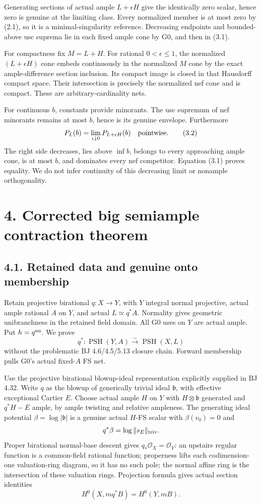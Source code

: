 \documentclass[
  10pt,
]{article}
\begin{document}
Generating sections of actual ample \(L+\epsilon H\) give the
identically zero scalar, hence zero is genuine at the limiting class.
Every normalized member is at most zero by (2.1), so it is a
minimal-singularity reference. Decreasing endpoints and bounded-above
usc suprema lie in each fixed ample cone by G0, and then in (3.1).

For compactness fix \(M=L+H\). For rational \(0<\epsilon\le1\), the
normalized \((L+\epsilon H)\) cone embeds continuously in the normalized
\(M\) cone by the exact ample-difference section inclusion. Its compact
image is closed in that Hausdorff compact space. Their intersection is
precisely the normalized nef cone and is compact. These are
arbitrary-cardinality nets.

For continuous \(b\), constants provide minorants. The usc supremum of
nef minorants remains at most \(b\), hence is its genuine envelope.
Furthermore
\[P_L(b)=\lim_{\epsilon\downarrow0}P_{L+\epsilon H}(b)\quad\hbox{pointwise}. \tag{3.2}\]
The right side decreases, lies above \(\inf b\), belongs to every
approaching ample cone, is at most \(b\), and dominates every nef
competitor. Equation (3.1) proves equality. We do not infer continuity
of this decreasing limit or nonample orthogonality.

\section{4. Corrected big semiample contraction
theorem}\label{corrected-big-semiample-contraction-theorem}

\subsection{4.1. Retained data and genuine onto
membership}\label{retained-data-and-genuine-onto-membership}

Retain projective birational \(q:X\to Y\), with \(Y\) integral normal
projective, actual ample rational \(A\) on \(Y\), and actual
\(L\simeq q^*A\). Normality gives geometric unibranchness in the
retained field domain. All G0 uses on \(Y\) are actual ample. Put
\(h=q^{\rm an}\). We prove
\[q^*:\operatorname{PSH}(Y,A)\xrightarrow{\sim}\operatorname{PSH}(X,L) \tag{4.1}\]
without the problematic BJ 4.6/4.5/5.13 closure chain. Forward
membership pulls G0's actual fixed-\(A\) FS net.

Use the projective birational blowup-ideal representation explicitly
supplied in BJ 4.32. Write \(q\) as the blowup of generically trivial
ideal \(\mathfrak b\), with effective exceptional Cartier \(E\). Choose
actual ample \(H\) on \(Y\) with \(H\otimes\mathfrak b\) generated and
\(q^*H-E\) ample, by ample twisting and relative ampleness. The
generating ideal potential \(\beta=\log|\mathfrak b|\) is a genuine
actual \(H\)-FS scalar with \(\beta(v_0)=0\) and
\[q^*\beta=\log\|s_E\|_{\rm triv}.\] Proper birational normal-base
descent gives \(q_*\mathcal O_X=\mathcal O_Y\): an upstairs regular
function is a common-field rational function; properness lifts each
codimension-one valuation-ring diagram, so it has no such pole; the
normal affine ring is the intersection of these valuation rings.
Projection formula gives actual section identities
\[H^0(X,mq^*B)=H^0(Y,mB). \tag{4.2}\]
\end{document}

